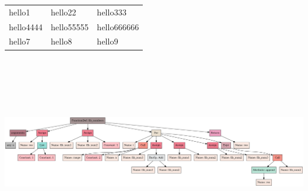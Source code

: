 \documentclass{article}
\begin{document}
\begin{tabular}{lll}
hello1&hello22&hello333\\
hello4444&hello55555&hello666666\\
hello7&hello8&hello9
\end{tabular}\\\\\\\\\\\includegraphics[width=\linewidth]{artifacts/fib_num_ast.png}
\end{document}
